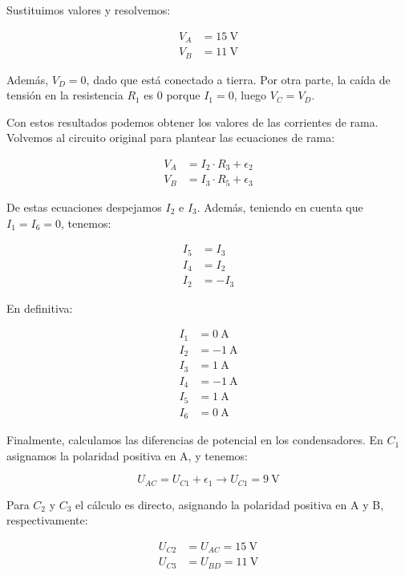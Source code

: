 \documentclass[10pt]{article}
\begin{document}
Sustituimos valores y resolvemos:

\begin{align*}
  V_A &= \SI{15}{\volt}\\
  V_B &= \SI{11}{\volt}
\end{align*}

Además, $V_D = 0$, dado que está conectado a tierra. Por otra parte, la caída de tensión en la resistencia $R_1$ es 0 porque $I_1 = 0$, luego $V_C = V_D$.

Con estos resultados podemos obtener los valores de las corrientes de rama. Volvemos al circuito original para plantear las ecuaciones de rama:

\begin{align*}
  V_A &= I_2 \cdot R_3 + \epsilon_2\\
  V_B &= I_3 \cdot R_5 + \epsilon_3
\end{align*}

De estas ecuaciones despejamos $I_2$ e $I_3$. Además, teniendo en cuenta que $I_1 = I_6 = 0$, tenemos:

\begin{align*}
  I_5 &= I_3\\
  I_4 &= I_2\\
  I_2 &= -I_3
\end{align*}

En definitiva:

\begin{align*}
  I_1 &= \SI{0}{\ampere}\\
  I_2 &= \SI{-1}{\ampere}\\
  I_3 &= \SI{1}{\ampere}\\
  I_4 &= \SI{-1}{\ampere}\\
  I_5 &= \SI{1}{\ampere}\\
  I_6 &= \SI{0}{\ampere}
\end{align*}

Finalmente, calculamos las diferencias de potencial en los
condensadores. En $C_1$ asignamos la polaridad positiva en A, y
tenemos:

\begin{equation*}
  U_{AC} = U_{C1} + \epsilon_1 \rightarrow U_{C1} = \SI{9}{\volt}
\end{equation*}

Para $C_2$ y $C_3$ el cálculo es directo, asignando la polaridad positiva en A y B, respectivamente:

\begin{align*}
  U_{C2} &=  U_{AC} = \SI{15}{\volt}\\
  U_{C3} &=  U_{BD} = \SI{11}{\volt}
\end{align*}
\end{document}
